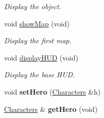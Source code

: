 \begin{DoxyCompactItemize}
\begin{DoxyCompactList}\small\item\em Display the object. \end{DoxyCompactList}\item 
void \hyperlink{class_game_ab1ab415f40c6a952da0f93a7bf3ffee1}{show\+Map} (void)
\begin{DoxyCompactList}\small\item\em Display the first map. \end{DoxyCompactList}\item 
void \hyperlink{class_game_a194dbc017575c98bda4e2317d266a67e}{display\+H\+U\+D} (void)
\begin{DoxyCompactList}\small\item\em Display the base H\+U\+D. \end{DoxyCompactList}\item 
\hypertarget{class_game_a730c7eeaa90f5ceab71abce303bfd367}{void {\bfseries set\+Hero} (\hyperlink{class_characters}{Characters} \&h)}\label{class_game_a730c7eeaa90f5ceab71abce303bfd367}

\item 
\hypertarget{class_game_a7f62e55c834c5ee4b626acb58f5bbd28}{\hyperlink{class_characters}{Characters} \& {\bfseries get\+Hero} (void)}\label{class_game_a7f62e55c834c5ee4b626acb58f5bbd28}

\end{DoxyCompactItemize}
